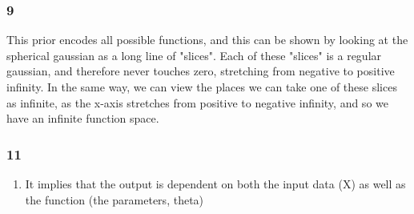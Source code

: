 \documentclass[11pt]{article}
\providecommand{\tightlist}{%
      \setlength{\itemsep}{0pt}\setlength{\parskip}{0pt}}
\begin{document}
    \subsubsection{9}\label{section}

This prior encodes all possible functions, and this can be shown by
looking at the spherical gaussian as a long line of "slices". Each of
these "slices" is a regular gaussian, and therefore never touches zero,
stretching from negative to positive infinity. In the same way, we can
view the places we can take one of these slices as infinite, as the
x-axis stretches from positive to negative infinity, and so we have an
infinite function space.

    \subsubsection{11}\label{section}

\begin{enumerate}
\def\labelenumi{\alph{enumi})}
\setcounter{enumi}{2}
\tightlist
\item
  It implies that the output is dependent on both the input data (X) as
  well as the function (the parameters, theta)
\end{enumerate}
\end{document}

